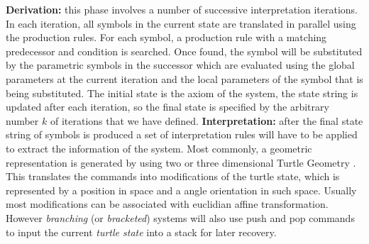 \documentclass[letterpaper,twoside,11pt]{article}
\begin{document}
\begin{multicols}{2}
\textbf{Derivation:} this phase involves a number of successive interpretation iterations. In each iteration, all symbols in the current state are translated in parallel using the production rules. For each symbol, a production rule with a matching predecessor and condition is searched. Once found, the symbol will be substituted by the parametric symbols in the successor which are evaluated using the global parameters at the current iteration and the local parameters of the symbol that is being substituted. The initial state is the axiom of the system, the state string is updated after each iteration, so the final state is specified by the arbitrary number $k$ of iterations that we have defined.
\vfill
\columnbreak
\textbf{Interpretation:} after the final state string of symbols is produced a set of interpretation rules will have to be applied to extract the information of the system. Most commonly, a geometric representation is generated by using two or three dimensional Turtle Geometry \cite{abelson1986turtle}. This translates the commands into modifications of the turtle state, which is represented by a position in space and a angle orientation in such space. Usually most modifications can be associated with euclidian affine transformation. However \emph{branching} (or \emph{bracketed}) systems will also use push and pop commands to input the current \emph{turtle state} into a stack for later recovery.


\end{multicols}
\end{document}
